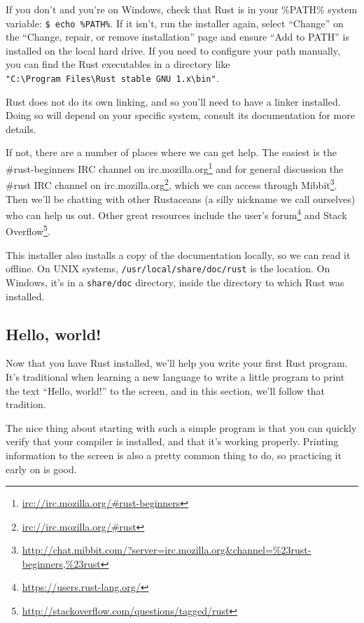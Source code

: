 \documentclass[a4paper,]{book}
\renewcommand{\href}[2]{#2\footnote{\url{#1}}}
\begin{document}
If you don't and you're on Windows, check that Rust is in your \%PATH\%
system variable: \texttt{\$\ echo\ \%PATH\%}. If it isn't, run the
installer again, select ``Change'' on the ``Change, repair, or remove
installation'' page and ensure ``Add to PATH'' is installed on the local
hard drive. If you need to configure your path manually, you can find
the Rust executables in a directory like
\texttt{"C:\textbackslash{}Program\ Files\textbackslash{}Rust\ stable\ GNU\ 1.x\textbackslash{}bin"}.

Rust does not do its own linking, and so you'll need to have a linker
installed. Doing so will depend on your specific system, consult its
documentation for more details.

If not, there are a number of places where we can get help. The easiest
is \href{irc://irc.mozilla.org/\#rust-beginners}{the \#rust-beginners
IRC channel on irc.mozilla.org} and for general discussion
\href{irc://irc.mozilla.org/\#rust}{the \#rust IRC channel on
irc.mozilla.org}, which we can access through
\href{http://chat.mibbit.com/?server=irc.mozilla.org\&channel=\%23rust-beginners,\%23rust}{Mibbit}.
Then we'll be chatting with other Rustaceans (a silly nickname we call
ourselves) who can help us out. Other great resources include
\href{https://users.rust-lang.org/}{the user's forum} and
\href{http://stackoverflow.com/questions/tagged/rust}{Stack Overflow}.

This installer also installs a copy of the documentation locally, so we
can read it offline. On UNIX systems, \texttt{/usr/local/share/doc/rust}
is the location. On Windows, it's in a \texttt{share/doc} directory,
inside the directory to which Rust was installed.

\subsection{Hello, world!}\label{hello-world}

Now that you have Rust installed, we'll help you write your first Rust
program. It's traditional when learning a new language to write a little
program to print the text ``Hello, world!'' to the screen, and in this
section, we'll follow that tradition.

The nice thing about starting with such a simple program is that you can
quickly verify that your compiler is installed, and that it's working
properly. Printing information to the screen is also a pretty common
thing to do, so practicing it early on is good.
\end{document}
